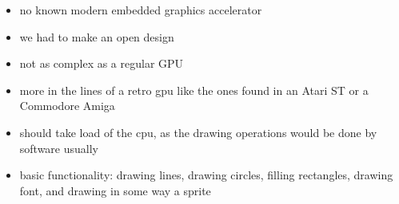 \begin{itemize}
	\item no known modern embedded graphics accelerator
	\item we had to make an open design
	\item not as complex as a regular GPU
	\item more in the lines of a retro gpu like the ones found in an Atari ST or a Commodore Amiga
	\item should take load of the cpu, as the drawing operations would be done by software usually
	\item basic functionality: drawing lines, drawing circles, filling rectangles, drawing font, and drawing in some way a sprite
\end{itemize}